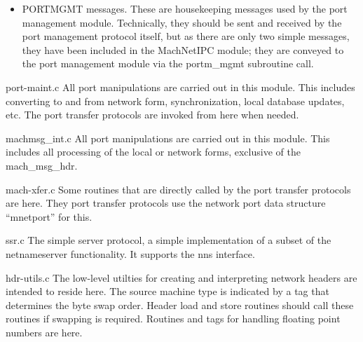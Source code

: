 \begin{description}
\begin{itemize}
\begin{itemize}
\item PORTMGMT messages.  These are housekeeping messages used by the
port management module.  Technically, they should be sent and received
by the port management protocol itself, but as there are only two
simple messages, they have been included in the MachNetIPC module;
they are conveyed to the port management module via the portm\_mgmt
subroutine call.
\end{itemize}
\end{itemize}

\item {port-maint.c}
All port manipulations are carried out in this module.  This includes
converting to and from network form, synchronization, local database
updates, etc.  The port transfer protocols are invoked from here
when needed.


\item {machmsg_int.c}
All port manipulations are carried out in this module.  This includes
all processing of the local or network forms, exclusive of the
mach\_msg\_hdr.

\item {mach-xfer.c}
Some routines that are directly called by the port transfer protocols
are here.  They port transfer protocols use the network port data
structure ``mnetport'' for this.

\item {ssr.c}
The simple server protocol, a simple implementation of a subset of
the netnameserver functionality.  It supports the nns interface.

\item {hdr-utils.c}
The low-level utilties for creating and interpreting network headers
are intended to reside here.  The source machine type is indicated by
a tag that determines the byte swap order.  Header load and store
routines should call these routines if swapping is required.  Routines
and tags for handling floating point numbers are here.

\end{description}

